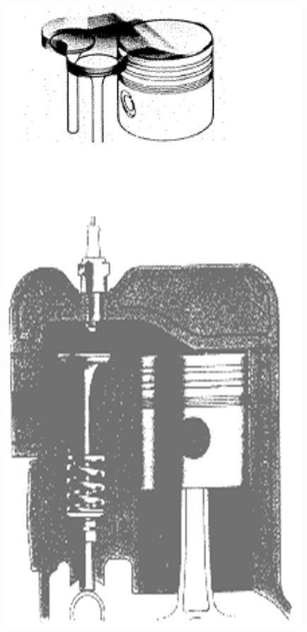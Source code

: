 	\begin{center}
	\begin{minipage}{0.18 \textwidth}
	\includegraphics[scale=0.25]{ch4/20}
	\end{minipage}
	\begin{minipage}{0.18 \textwidth}

\end{minipage}
\end{center}
